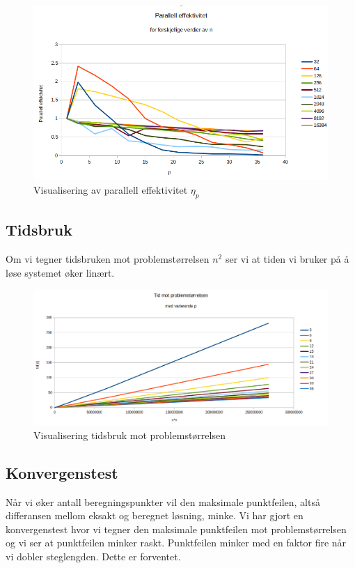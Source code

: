 \documentclass[11pt,norsk,a4paper]{article}
\begin{document}
\begin{figure}[h]
\centering
\includegraphics[scale=0.5]{plot_parallell.png}
\caption{Visualisering av parallell effektivitet $\eta_p$}
\end{figure}

\subsection{Tidsbruk}

Om vi tegner tidsbruken mot problemstørrelsen $n^2$ ser vi at tiden vi bruker på å løse systemet øker linært. 

\begin{figure}[h]
\centering
\includegraphics[scale=0.4]{plot_tid_p.png}
\caption{Visualisering tidsbruk mot problemstørrelsen}
\end{figure}



\subsection{Konvergenstest}
Når vi øker antall beregningspunkter vil den maksimale punktfeilen, altså differansen mellom eksakt og beregnet løsning, minke. Vi har gjort en konvergenstest hvor vi tegner den maksimale punktfeilen mot problemstørrelsen og vi ser at punktfeilen minker raskt. Punktfeilen minker med en faktor fire når vi dobler steglengden. Dette er forventet. 
\end{document}
